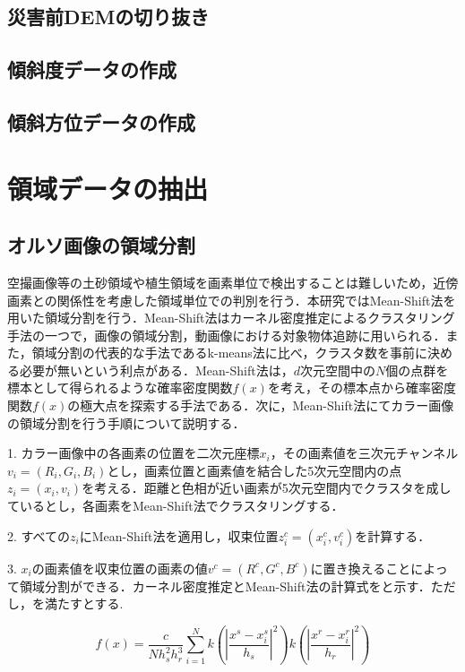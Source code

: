     \subsection{災害前DEMの切り抜き}

    \subsection{傾斜度データの作成}
    \subsection{傾斜方位データの作成}

  \section{領域データの抽出}
    \subsection{オルソ画像の領域分割}
      空撮画像等の土砂領域や植生領域を画素単位で検出することは難しいため，近傍画素との関係性を考慮した領域単位での判別を行う．本研究ではMean-Shift法\cite{}を用いた領域分割を行う．Mean-Shift法はカーネル密度推定によるクラスタリング手法の一つで，画像の領域分割，動画像における対象物体追跡に用いられる．また，領域分割の代表的な手法であるk-means法\cite{}に比べ，クラスタ数を事前に決める必要が無いという利点がある．Mean-Shift法は，$d$次元空間中の$N$個の点群を標本として得られるような確率密度関数$f(x)$を考え，その標本点から確率密度関数$f(x)$の極大点を探索する手法である．次に，Mean-Shift法にてカラー画像の領域分割を行う手順について説明する．

      1. カラー画像中の各画素の位置を二次元座標$x_i$，その画素値を三次元チャンネル$v_{i} =(R_{i},G_{i},B_{i})$とし，画素位置と画素値を結合した5次元空間内の点$z_{i} = (x_{i}, v_{i})$を考える．距離と色相が近い画素が5次元空間内でクラスタを成しているとし，各画素をMean-Shift法でクラスタリングする．

      2. すべての$z_{i}$にMean-Shift法を適用し，収束位置$z_{i}^c = (x_{i}^c , v_{i}^c)$を計算する．
      
      3. $x_{i}$の画素値を収束位置の画素の値$v^c = (R^c, G^c, B^c)$に置き換えることによって領域分割ができる．カーネル密度推定とMean-Shift法の計算式をと示す．ただし，を満たすとする.
    
      \begin{equation}
        \label{Mean-Shift法1}
        f(x) = \dfrac{c} {N h_{s}^2 h_{r}^3}
          \sum_{i=1}^{N}
          k (|\dfrac{x^s - x_{i}^s} {h_{s}}|^2) k (|\dfrac{x^r - x_{i}^r} {h_{r}}|^2)
      \end{equation}

